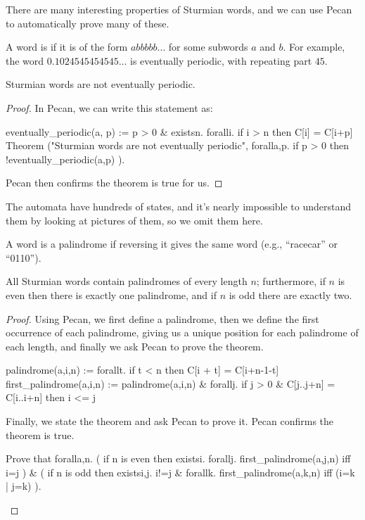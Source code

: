 \documentclass[a4paper,usenames,dvipsnames]{article}
\begin{document}
There are many interesting properties of Sturmian words, and we can use Pecan to automatically prove many of these.

\begin{definition}
    A word is  if it is of the form $abbbbb \ldots$ for some subwords $a$ and $b$.
    For example, the word $0.1024545454545\ldots$ is eventually periodic, with repeating part $45$.
\end{definition}

\begin{theorem}
    Sturmian words are not eventually periodic.
\end{theorem}
\begin{proof}
    In Pecan, we can write this statement as:
    
    \begin{pecan}
    eventually_periodic(a, p) := 
        p > 0 & existsn. foralli. if i > n then C[i] = C[i+p]
    Theorem ("Sturmian words are not eventually periodic", 
    { foralla,p. if p > 0 then !eventually_periodic(a,p) }).
    \end{pecan}
    
    Pecan then confirms the theorem is true for us.
\end{proof}
    
The automata have hundreds of states, and it's nearly impossible to understand them by looking at pictures of them, so we omit them here.

\begin{definition}
    A word is a palindrome if reversing it gives the same word (e.g., ``racecar'' or ``0110'').
\end{definition}

\begin{theorem}
All Sturmian words contain palindromes of every length $n$; furthermore, if $n$ is even then there is exactly one palindrome, and if $n$ is odd there are exactly two.
\end{theorem}
\begin{proof}
Using Pecan, we first define a palindrome, then we define the first occurrence of each palindrome, giving us a unique position for each palindrome of each length, and finally we ask Pecan to prove the theorem.
\begin{pecan}
palindrome(a,i,n) :=
    forallt. if t < n then C[i + t] = C[i+n-1-t]
first_palindrome(a,i,n) := palindrome(a,i,n) & 
    forallj. if j > 0 & C[j..j+n] = C[i..i+n] then i <= j
\end{pecan}
    
Finally, we state the theorem and ask Pecan to prove it. 
Pecan confirms the theorem is true.

\begin{pecan}
Prove that { foralla,n. (
if n is even then 
    existsi. forallj. first_palindrome(a,j,n) iff i=j
) & (
if n is odd then
    existsi,j. i!=j & forallk. first_palindrome(a,k,n) iff (i=k | j=k)
)}.
\end{pecan}
\end{proof}
\end{document}
